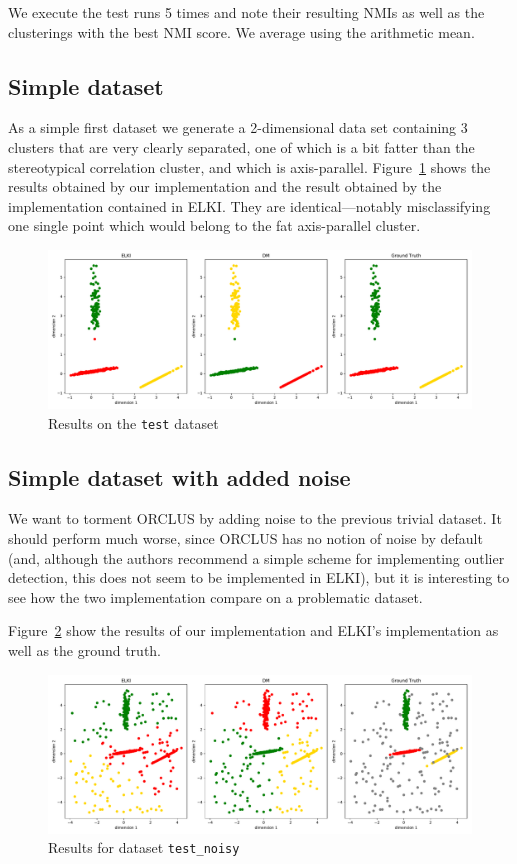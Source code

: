 \documentclass[english]{scrartcl}
\begin{document}
We execute the test runs 5 times and note their resulting NMIs as well as the clusterings with the
best NMI score. We average using the arithmetic mean.

\subsection{Simple dataset}

As a simple first dataset we generate a 2-dimensional data set containing 3 clusters that are very clearly
separated, one of which is a bit fatter than the stereotypical correlation cluster, and which is
axis-parallel. Figure~\ref{fig:test} shows the results obtained by our implementation
and the result obtained by the implementation contained in ELKI. They are identical---notably misclassifying one
single point which would belong to the fat axis-parallel cluster.

\begin{figure}[tb]
    \centering
    \includegraphics[width=\textwidth]{img/test_cmp}
    \caption{Results on the \texttt{test} dataset}
    \label{fig:test}
\end{figure}

\subsection{Simple dataset with added noise}

We want to torment ORCLUS by adding noise to the previous trivial dataset.
It should perform much worse, since ORCLUS has no notion of noise by default
(and, although the authors recommend a simple scheme for implementing outlier
detection, this does not seem to be implemented in ELKI), but it is interesting
to see how the two implementation compare on a problematic dataset.

Figure~\ref{fig:noisy-cmp} show the results
of our implementation and ELKI's implementation as well as the ground truth.

\begin{figure}[tb]
    \centering
    \includegraphics[width=\textwidth]{img/test_noisy_cmp}
    \caption{Results for dataset \texttt{test\_noisy}}
    \label{fig:noisy-cmp}
\end{figure}
\end{document}
